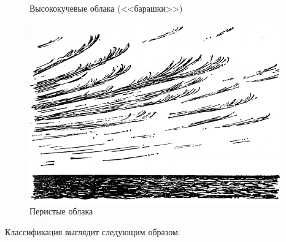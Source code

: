 \documentclass[a4paper, 12pt, twoside, final, book, russian, fittopage, cyremdash]{ncc}
\begin{document}
\begin{figure}
\begin{minipage}[b]{0.49\textwidth}
    \caption{Высококучевые облака (<<барашки>>)}
    \label{fig:114}
  \end{minipage}
  \hfil\hfil
  \begin{minipage}[b]{0.49\textwidth}
    \centering
    \includegraphics[scale=1.2]{0115P}
    \caption{Перистые облака}
    \label{fig:115}
  \end{minipage}
\end{figure}


Классификация выглядит следующим образом:
\end{document}
